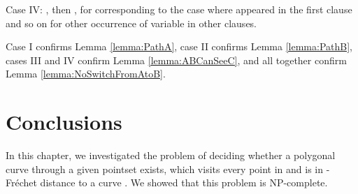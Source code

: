 \documentclass[12pt]{dalthesis}
\newcommand{\Frechet}{Fr\'echet }
\begin{document}
Case IV: , 
then 
, for  corresponding to the case 
where  appeared in the 
first clause 
and so on for other occurrence of 
variable  in other clauses. 



\vspace{0.1 in}
Case I confirms Lemma \ref{lemma:PathA},
case II confirms Lemma \ref{lemma:PathB},
cases III and IV confirm Lemma \ref{lemma:ABCanSeeC},
and all together confirm Lemma \ref{lemma:NoSwitchFromAtoB}.




\section{Conclusions}
\label{sec:conc}
In this chapter, we investigated the problem of deciding whether a polygonal curve through a given pointset  exists, which 
visits every point in  and
 is in -\Frechet distance 
to a curve . We showed that this problem is NP-complete. 





\clearpage{}
\end{document}
